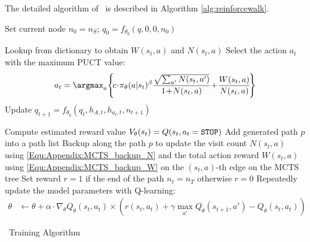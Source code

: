 The detailed algorithm of \modelname~is described in Algorithm \ref{alg:reinforcewalk}. 
\begin{algorithm}[h]
	\begin{algorithmic}[1]
		\STATE Set current node $n_0 = n_S$; $q_{0} = f_{\theta_q}(q, 0, 0, n_0)$\;

		\STATE Lookup from dictionary to obtain $W(s_t, a)$ and $N(s_t, a)$ \;
		\STATE Select the action $a_{t}$ with the maximum PUCT value:
		\begin{align}
		a_t =
		\argmax_a \! \left\{ \! c \!\cdot\! \pi_{\theta}(a | s_t)^{\beta} \frac{\sqrt{\sum_{a'} N(s_t, a')}}{1 \!+\! N(s_t, a) } \!+\! \frac{W(s_t, a)} {N(s_t, a)}
		\!\right\} \nonumber
		\end{align}
		\STATE Update $q_{t+1} = f_{\theta_q}(q_t, h_{A, t}, h_{a_t, t}, n_{t+1})$\;

		\STATE Compute estimated reward value $V_{\theta}(s_t) = Q(s_t, a_t=\tt{STOP})$ \;
		\STATE Add generated path $p$ into a path list \;
		\STATE Backup along the path $p$ to update the visit count $N(s_t, a)$ using \eqref{Equ:Appendix:MCTS_backup_N} and the total action reward $W(s_t, a)$ using \eqref{Equ:Appendix:MCTS_backup_W} on the $(s_t, a)$-th edge on the MCTS tree \;
		\ENDIF
		\ENDFOR
		\ENDFOR
		\STATE Set reward $r = 1$ if the end of the path $n_t = n_{T}$ otherwise $r=0$\;
		\STATE Repeatedly update the model parameters with Q-learning:
		\begin{align}
		\theta	&\leftarrow	\theta  + \alpha \cdot \nabla_{\theta} Q_{\theta}(s_t,a_t) \times
		\left( r(s_t,a_t)
		+ \gamma \max_{a'} Q_{\theta}(s_{t+1},a') - Q_{\theta}(s_t,a_t) \right) \nonumber
		\end{align}
	\ENDFOR	
	\caption{\modelname~Training Algorithm}
	\label{alg:reinforcewalk}
	\end{algorithmic}
\end{algorithm}

